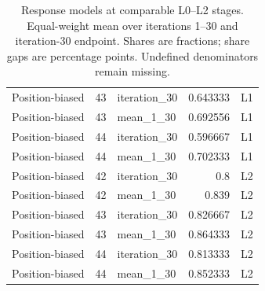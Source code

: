\begin{table}[htbp!]
\begin{tabular}{lrlrl}
Position-biased & 43 & iteration\_30 & 0.643333 & L1 \\
Position-biased & 43 & mean\_1\_30 & 0.692556 & L1 \\
Position-biased & 44 & iteration\_30 & 0.596667 & L1 \\
Position-biased & 44 & mean\_1\_30 & 0.702333 & L1 \\
Position-biased & 42 & iteration\_30 & 0.8 & L2 \\
Position-biased & 42 & mean\_1\_30 & 0.839 & L2 \\
Position-biased & 43 & iteration\_30 & 0.826667 & L2 \\
Position-biased & 43 & mean\_1\_30 & 0.864333 & L2 \\
Position-biased & 44 & iteration\_30 & 0.813333 & L2 \\
Position-biased & 44 & mean\_1\_30 & 0.852333 & L2 \\
\hline
\end{tabular}
\caption{Response models at comparable L0--L2 stages. Equal-weight mean over iterations 1--30 and iteration-30 endpoint. Shares are fractions; share gaps are percentage points. Undefined denominators remain missing.}
\label{chap:results:tab:rq2_models_head_clicks}
\end{table}
